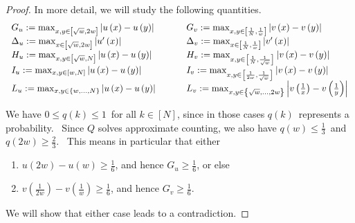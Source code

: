 \documentclass[10pt,a4paper]{article}
\newcommand{\<}{\langle}
\renewcommand{\>}{\rangle}
\begin{document}
\begin{proof}
In more detail, we will study the following quantities.
\begin{equation}
\begin{tabular}
[c]{ll}
$G_{u}:=\max_{x,y\in\left[  \sqrt{w},2w\right]  }\left\vert u\left(  x\right)
-u\left(  y\right)  \right\vert ~\ \ \ \ \ \ $ & $G_{v}:=\max_{x,y\in\left[
\frac{1}{N},\frac{1}{w}\right]  }\left\vert v\left(  x\right)  -v\left(
y\right)  \right\vert $\\
$\Delta_{u}:=\max_{x\in\left[  \sqrt{w},2w\right]  }\left\vert u^{\prime
}\left(  x\right)  \right\vert $ & $\Delta_{v}:=\max_{x\in\left[  \frac{1}
{N},\frac{1}{w}\right]  }\left\vert v^{\prime}\left(  x\right)  \right\vert
$\\
$H_{u}:=\max_{x,y\in\left[  \sqrt{w},N\right]  }\left\vert u\left(  x\right)
-u\left(  y\right)  \right\vert $ & $H_{v}:=\max_{x,y\in\left[  \frac{1}
{N},\frac{1}{\sqrt{w}}\right]  }\left\vert v\left(  x\right)  -v\left(
y\right)  \right\vert $\\
$I_{u}:=\max_{x,y\in\left[  w,N\right]  }\left\vert u\left(  x\right)
-u\left(  y\right)  \right\vert $ & $I_{v}:=\max_{x,y\in\left[  \frac{1}
{2w},\frac{1}{\sqrt{w}}\right]  }\left\vert v\left(  x\right)  -v\left(
y\right)  \right\vert $\\
$L_{u}:=\max_{x,y\in\left\{  w,\ldots,N\right\}  }\left\vert u\left(
x\right)  -u\left(  y\right)  \right\vert $ & $L_{v}:=\max_{x,y\in\left\{
\sqrt{w},\ldots,2w\right\}  }\left\vert v\left(  \frac{1}{x}\right)  -v\left(
\frac{1}{y}\right)  \right\vert $
\end{tabular}
\end{equation}


We have $0\leq q\left(  k\right)  \leq1$\ for all $k\in\left[  N\right]  $,
since in those cases $q\left(  k\right)  $\ represents a probability. \ Since
$Q$ solves approximate counting, we also have $q\left(  w\right)  \leq\frac
{1}{3}$\ and $q\left(  2w\right)  \geq\frac{2}{3}$. \ This means in particular
that either

\begin{enumerate}
\item[(i)] $u\left(  2w\right)  -u\left(  w\right)  \geq\frac{1}{6}$, and
hence $G_{u}\geq\frac{1}{6}$, or else

\item[(ii)] $v\left(  \frac{1}{2w}\right)  -v\left(  \frac{1}{w}\right)
\geq\frac{1}{6}$, and hence $G_{v}\geq\frac{1}{6}$.
\end{enumerate}

We will show that either case leads to a contradiction.


\end{proof}
\end{document}
